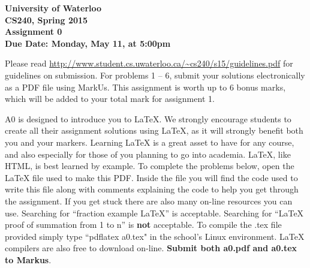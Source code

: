 \documentclass[12pt]{article}
\begin{document}
\begin{center}
{\Large\bf University of Waterloo}\\
\vspace{3mm}
{\Large\bf CS240, Spring 2015}\\
\vspace{2mm}
{\Large\bf Assignment 0}\\
\vspace{3mm}
\textbf{Due Date: Monday, May 11, at 5:00pm}
\end{center}

\def\question#1{\item[\bf #1.]}
\def\part#1{\item[\bf #1)]}
\newcommand{\pc}[1]{\mbox{\textbf{#1}}} %

Please read
\url{http://www.student.cs.uwaterloo.ca/~cs240/s15/guidelines.pdf}
for guidelines on submission.  For problems 1 -- 6, submit your
solutions electronically as a PDF file using MarkUs.
This assignment is worth up to 6 bonus marks, which will be added to
your total mark for assignment 1.


A0 is designed to introduce you to \LaTeX{}.
We strongly encourage students to create all their assignment solutions using \LaTeX{},
as it will strongly benefit both you and your markers. Learning \LaTeX{} is a great asset 
to have for any course, and also especially for those of you planning to go into academia.
\LaTeX{}, like HTML, is best learned by example. To complete the problems below, open the 
\LaTeX{} file used to make this PDF. Inside the file you will find the code used to write this
file along with comments explaining the code to help you get through the assignment. If you get
stuck there are also many on-line resources you can use. Searching for ``fraction example \LaTeX{}'' 
is acceptable. Searching for ``\LaTeX{} proof of summation from 1 to n'' 
is {\bf not} acceptable. To compile the .tex file provided simply type ``pdflatex a0.tex" 
in the school's Linux environment. \LaTeX{}  compilers are also free to download on-line.
{\bf Submit both a0.pdf and a0.tex to Markus}.
\end{document}
